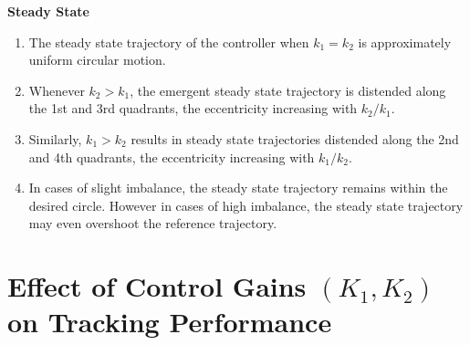 \documentclass[12pt]{article}
\begin{document}
\noindent\textbf{Steady State}
\begin{enumerate}
    \item The steady state trajectory of the controller when \(k_1=k_2\) is approximately uniform circular motion.
    \item Whenever \(k_2>k_1\), the emergent steady state trajectory is distended along the 1st and 3rd quadrants, the eccentricity increasing with \(k_2/k_1\).
    \item Similarly, \(k_1>k_2\) results in steady state trajectories distended along the 2nd and 4th quadrants, the eccentricity increasing with \(k_1/k_2\).
    \item In cases of slight imbalance, the steady state trajectory remains within the desired circle. However in cases of high imbalance, the steady state trajectory may even overshoot the reference trajectory. 
\end{enumerate}


\section{Effect of Control Gains $(K_1, K_2)$ on Tracking Performance}
\end{document}
